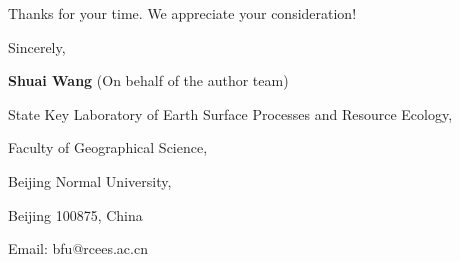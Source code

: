 \documentclass[11pt,a4paper,roman]{moderncv}
\begin{document}
\vspace{0.3cm}

Thanks for your time. We appreciate your consideration!

\vspace{0.3cm}

Sincerely,

\textbf{Shuai Wang} (On behalf of the author team)


State Key Laboratory of Earth Surface Processes and Resource Ecology,

Faculty of Geographical Science,

Beijing Normal University,

Beijing 100875, China

Email: bfu@rcees.ac.cn
\end{document}
